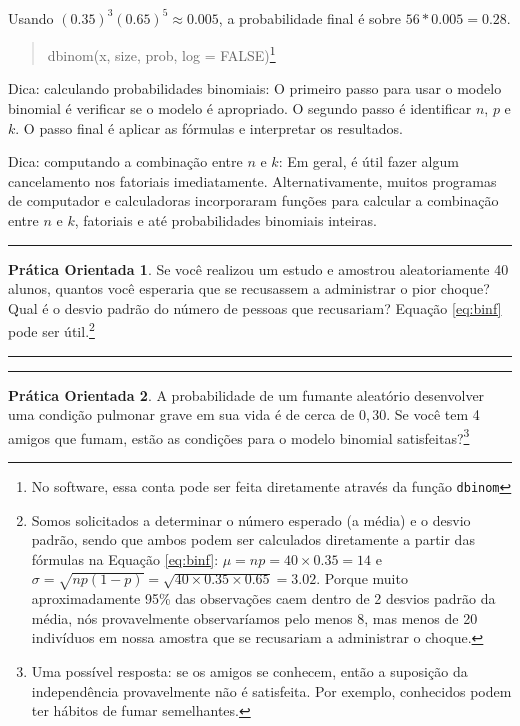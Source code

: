 \documentclass[
]{book}
\theoremstyle{definition}
\theoremstyle{definition}
\theoremstyle{definition}
\newtheorem{exercise}{Prática Orientada}[chapter]
\theoremstyle{definition}
\theoremstyle{remark}
\begin{document}
Usando \((0.35)^3(0.65)^5 \approx 0.005\), a probabilidade final é sobre \(56*0.005 = 0.28\).

\begin{quote}
dbinom(x, size, prob, log = FALSE)\footnote{No software, essa conta pode ser feita diretamente através da função \texttt{dbinom}}
\end{quote}

Dica: calculando probabilidades binomiais: O primeiro passo para usar o modelo binomial é verificar se o modelo é apropriado. O segundo passo é identificar \(n\), \(p\) e \(k\). O passo final é aplicar as fórmulas e interpretar os resultados.

Dica: computando a combinação entre \(n\) e \(k\): Em geral, é útil fazer algum cancelamento nos fatoriais imediatamente. Alternativamente, muitos programas de computador e calculadoras incorporaram funções para calcular a combinação entre \(n\) e \(k\), fatoriais e até probabilidades binomiais inteiras.

\begin{center}\rule{0.5\linewidth}{0.5pt}\end{center}

\begin{exercise}
\protect\hypertarget{exr:unnamed-chunk-130}{}{\label{exr:unnamed-chunk-130} }Se você realizou um estudo e amostrou aleatoriamente 40 alunos, quantos você esperaria que se recusassem a administrar o pior choque? Qual é o desvio padrão do número de pessoas que recusariam? Equação \eqref{eq:binf} pode ser útil.\footnote{Somos solicitados a determinar o número esperado (a média) e o desvio padrão, sendo que ambos podem ser calculados diretamente a partir das fórmulas na Equação \eqref{eq:binf}: \(\mu=np = 40\times 0.35 = 14\) e \(\sigma = \sqrt{np(1-p)} = \sqrt{40\times 0.35\times 0.65} = 3.02\). Porque muito aproximadamente 95\% das observações caem dentro de 2 desvios padrão da média, nós provavelmente observaríamos pelo menos 8, mas menos de 20 indivíduos em nossa amostra que se recusariam a administrar o choque.}
\end{exercise}

\begin{center}\rule{0.5\linewidth}{0.5pt}\end{center}

\begin{center}\rule{0.5\linewidth}{0.5pt}\end{center}

\begin{exercise}
\protect\hypertarget{exr:unnamed-chunk-131}{}{\label{exr:unnamed-chunk-131} }A probabilidade de um fumante aleatório desenvolver uma condição pulmonar grave em sua vida é de cerca de \(0,30\). Se você tem 4 amigos que fumam, estão as condições para o modelo binomial satisfeitas?\footnote{Uma possível resposta: se os amigos se conhecem, então a suposição da independência provavelmente não é satisfeita. Por exemplo, conhecidos podem ter hábitos de fumar semelhantes.}
\end{exercise}
\end{document}
